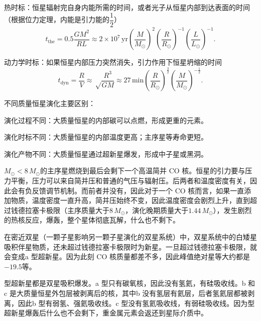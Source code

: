 \documentclass[../天体物理基础.tex]{subfiles}
\begin{document}
热时标：恒星辐射完自身内能所需的时间，或者光子从恒星内部到达表面的时间（根据位力定理，内能是引力能的$\dfrac{1}{2}$）
\begin{equation}
t_{\text{the}}=0.5\frac{GM^{2}}{RL}\approx2\times10^{7}\,\mathrm{yr}\left(\frac{M}{M_{\odot}}\right)^{2}\left(\frac{R}{R_{\odot}}\right)^{-1}\left(\frac{L}{L_{\odot}}\right)^{-1}.
\end{equation}

动力学时标：如果恒星内部压力突然消失，引力作用下恒星坍缩的时间
\begin{equation}
t_{\text{dyn}}=\frac{R}{V}\approx\sqrt\frac{R^{3}}{GM}\approx27\,\mathrm{min}\left(\frac{R}{R_{\odot}}\right)^{\frac{3}{2}}\left(\frac{M}{M_{\odot}}\right)^{-\frac{1}{2}}.
\end{equation}



不同质量恒星演化主要区别：

演化过程不同：大质量恒星的内部碳可以点燃，形成更重的元素。

演化时标不同：大质量恒星的内部温度更高；主序星等寿命更短。

演化产物不同：大质量恒星通过超新星爆发，形成中子星或黑洞。

$M_{\odot}<8\,M_{\odot}$的主序星燃烧到最后会剩下一个高温简并 CO 核。恒星的引力要与压力平衡，压力可以来自简并压和普通的气压与辐射压。后两者和温度密度有关，因此会有负反馈调节机制。而前者并没有，因此对于一个 CO 核而言，如果一直添加物质，温度密度一直升高，简并压始终不变，因此温度密度会剧烈上升，直到超过钱德拉塞卡极限（主序质量大于$8\,M_{\odot}$，演化晚期质量大于$1.44\,M_{\odot}$），发生剧烈的热核反应，爆轰，整个星体彻底瓦解，什么也不剩下。

在密近双星（一颗子星影响另一颗子星演化的双星系统）中，双星系统中的白矮星吸积伴星物质，还未超过钱德拉塞卡极限时为新星。一旦超过钱德拉塞卡极限，就会变成\uppercase\expandafter{}a 型超新星。因为此刻 CO 核质量都差不多，因此峰值绝对星等大约都是$-19.5$等。

\uppercase\expandafter{}型超新星都是双星吸积爆发。\uppercase\expandafter{}a 型只有碳氧核，因此没有氢氦，有硅吸收线。\uppercase\expandafter{}b 和\uppercase\expandafter{}c 是大质量恒星外包层被剥离后的核，其中\uppercase\expandafter{}b 没有氢层有氦层，后者氢氦层都被剥离，因此\uppercase\expandafter{}b 型有弱氢、强氦吸收线。\uppercase\expandafter{}c 型没有氢氦吸收线，有弱硅吸收线。因为\uppercase\expandafter{}型超新星爆轰后什么也不会剩下，重金属元素会返还到星际介质中。
\end{document}
